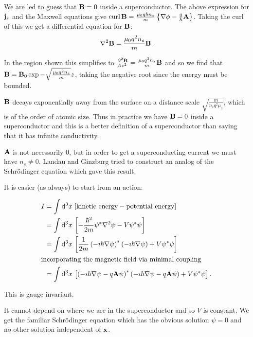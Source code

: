 \documentclass{notes}
\newcommand{\B}{\vect{B}}
\newcommand{\jc}{\vect{j}}
\DeclareMathOperator{\curl}{curl}
\begin{document}
\vspace{1in}

We are led to guess that $\B = 0$ inside a superconductor.  The above
expression for $\jc_s$ and the Maxwell equations give $\curl \B =
\frac{\mu_0 q \hbar n_s}{m} \left\{ \nabla \phi - \frac{q}{\hbar}
  \vect{A} \right\}$.  Taking the curl of this we get a differential
equation for $\B$:
\[
\nabla^2 \B = \frac{\mu_0 q^2 n_s}{m} \B.
\]

\vspace{1in}

In the region shown this simplifies to $\pd{^2 \B}{z^2} = \frac{\mu_0
  q^2 n_s}{m} \B$ and so we find that $\B = \B_0 \exp - \sqrt{
  \frac{\mu_0 q^2 n_s}{m}} z$, taking the negative root since the
energy must be bounded.

$\B$ decays exponentially away from the surface on a distance scale
$\sqrt{\frac{m}{n_s q^2 \mu_0}}$, which is of the order of atomic
size.  Thus in practice we have $\B = 0$ inside a superconductor and
this is a better definition of a superconductor than saying that it
has infinite conductivity.

$\mathbf{A}$ is not necessarily $0$, but in order to get a
superconducting current we must have $n_s \neq 0$.  Landau and
Ginzburg tried to construct an analog of the Schr\"odinger equation
which gave this result.

It is easier (as always) to start from an action:

\begin{align*}
I &= \int \mathrm{d}^3 x\, \left[ \text{kinetic energy} - \text{potential energy}
\right] \\
&= \int \mathrm{d}^3 x\, \left[- \frac{\hbar^2}{2m} \psi^\ast \nabla^2 \psi
- V \psi^\ast \psi \right] \\
&= \int \mathrm{d}^3 x\, \left[\frac{1}{2m} \left( - \imath \hbar \nabla \psi
\right)^\ast \left( - \imath \hbar \nabla \psi\right) + V \psi^\ast \psi
 \right]\\
\intertext{incorporating the magnetic field via minimal coupling}
&= \int \mathrm{d}^3 x\, \left[ \left( - \imath \hbar \nabla \psi
- q \mathbf{A} \psi \right)^\ast
\left( - \imath \hbar \nabla \psi - q \mathbf{A} \psi \right)
+ V \psi^\ast \psi \right].
\end{align*}

This is gauge invariant.

It cannot depend on where we are in the superconductor and so $V$
is constant.  We get the familiar Schr\"odinger equation which
has the obvious solution $\psi = 0$ and no other solution independent of
$\mathbf{x}$.
\end{document}
